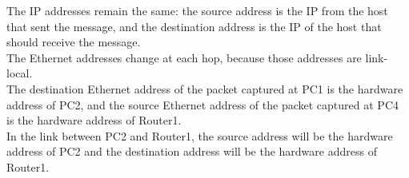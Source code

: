 The IP addresses remain the same: the source address is the IP from the host that sent the message, and the destination address is the IP of the host that should receive the message.\\

The Ethernet addresses change at each hop, because those addresses are link-local. \\The destination Ethernet address of the packet captured at PC1 is the hardware address of PC2, and the source Ethernet address of the packet captured at PC4 is the hardware address of Router1. \\In the link between PC2 and Router1, the source address will be the hardware address of PC2 and the destination address will be the hardware address of Router1.